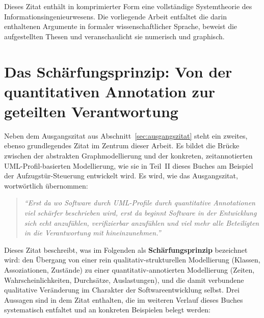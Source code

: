 ﻿\documentclass[a4paper,12pt]{report}
\theoremstyle{definition}
\begin{document}
\noindent
Dieses Zitat enthält in komprimierter Form eine vollständige Systemtheorie des
Informationsingenieurwesens. Die vorliegende Arbeit entfaltet die darin enthaltenen
Argumente in formaler wissenschaftlicher Sprache, beweist die aufgestellten Thesen und
veranschaulicht sie numerisch und graphisch.

\section{Das Schärfungsprinzip: Von der quantitativen Annotation zur geteilten Verantwortung}
\label{sec:schaerfungsprinzip}

Neben dem Ausgangszitat aus Abschnitt~\ref{sec:ausgangszitat} steht ein zweites,
ebenso grundlegendes Zitat im Zentrum dieser Arbeit. Es bildet die Brücke zwischen
der abstrakten Graphmodellierung und der konkreten, zeitannotierten
UML-Profil-basierten Modellierung, wie sie in Teil~II dieses Buches am Beispiel der
Aufzugstür-Steuerung entwickelt wird. Es wird, wie das Ausgangszitat, wortwörtlich
übernommen:

\begin{quotation}
\noindent\textit{%
``Erst da wo Software durch UML-Profile durch quantitative Annotationen
viel schärfer beschrieben wird, erst da beginnt Software in der Entwicklung
sich echt anzufühlen, verifizierbar anzufühlen und viel mehr alle
Beteiligten in die Verantwortung mit hineinzunehmen.''
}
\end{quotation}

\noindent
Dieses Zitat beschreibt, was im Folgenden als \textbf{Schärfungsprinzip} bezeichnet
wird: den Übergang von einer rein qualitativ-strukturellen Modellierung (Klassen,
Assoziationen, Zustände) zu einer quantitativ-annotierten Modellierung (Zeiten,
Wahrscheinlichkeiten, Durchsätze, Auslastungen), und die damit verbundene qualitative
Veränderung im Charakter der Softwareentwicklung selbst. Drei Aussagen sind in dem
Zitat enthalten, die im weiteren Verlauf dieses Buches systematisch entfaltet und an
konkreten Beispielen belegt werden:
\end{document}
